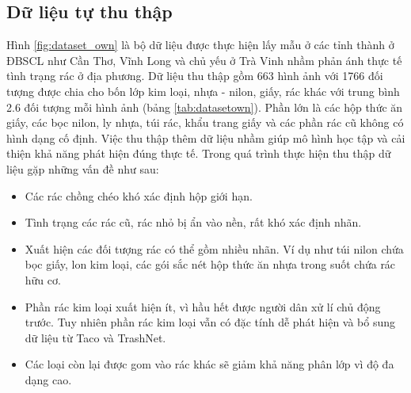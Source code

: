 \documentclass[../the.tex]{subfiles}
\begin{document}
\subsection{Dữ liệu tự thu thập}
\label{sec:own}
{\fontsize{13}{12} \selectfont
Hình \ref{fig:dataset_own} là bộ dữ liệu được thực hiện lấy mẫu ở các tỉnh thành ở ĐBSCL như Cần Thơ, Vĩnh Long và chủ yếu ở Trà Vinh nhầm phản ánh thực tế tình trạng rác ở địa phương. 
Dữ liệu thu thập gồm 663 hình ảnh với 1766 đối tượng được chia cho bốn lớp kim loại, nhựa - nilon, giấy, rác khác với trung bình 2.6 đối tượng mỗi hình ảnh (bảng \ref{tab:datasetown}).
Phần lớn là các hộp thức ăn giấy, các bọc nilon, ly nhựa, túi rác, khẩu trang giấy và các phần rác cũ không có hình dạng cố định. 
Việc thu thập thêm dữ liệu nhầm giúp mô hình học tập và cải thiện khả năng phát hiện đúng thực tế. Trong quá trình thực hiện thu thập dữ liệu gặp những vấn đề như sau:
\begin{itemize}
	\item Các rác chồng chéo khó xác định hộp giới hạn.
	\item Tình trạng các rác cũ, rác nhỏ bị ẩn vào nền, rất khó xác định nhãn.
	\item Xuất hiện các đối tượng rác có thể gồm nhiều nhãn. Ví dụ như túi nilon chứa bọc giấy, lon kim loại, các gói sắc nét hộp thức ăn nhựa trong suốt chứa rác hữu cơ.
	\item Phần rác kim loại xuất hiện ít, vì hầu hết được người dân xử lí chủ động trước. Tuy nhiên phần rác kim loại vẫn có đặc tính dễ phát hiện và bổ sung dữ liệu từ Taco \cite{proença2020taco} và TrashNet.
	\item Các loại còn lại được gom vào rác khác sẽ giảm khả năng phân lớp vì độ đa dạng cao.
\end{itemize}

\bigskip
}
\end{document}
